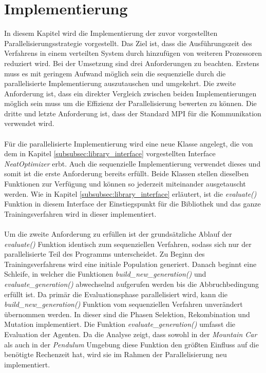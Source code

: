 \section{Implementierung}
\label{sec:parallel_implementation}
In diesem Kapitel wird die Implementierung der zuvor vorgestellten Parallelisierungsstrategie vorgestellt. Das Ziel ist, dass die Ausführungszeit des Verfahrens in einem verteilten System durch hinzufügen von weiteren Prozessoren reduziert wird. Bei der Umsetzung sind drei Anforderungen zu beachten. Erstens muss es mit geringem Aufwand möglich sein die sequenzielle durch die parallelisierte Implementierung auszutauschen und umgekehrt. Die zweite Anforderung ist, dass ein direkter Vergleich zwischen beiden Implementierungen möglich sein muss um die Effizienz der Parallelisierung bewerten zu können. Die dritte und letzte Anforderung ist, dass der Standard \ac{MPI} für die Kommunikation verwendet wird.
\\\\
Für die parallelisierte Implementierung wird eine neue Klasse angelegt, die von dem in Kapitel \ref{subsubsec:library_interface} vorgestellten Interface \emph{NeatOptimizer} erbt. Auch die sequenzielle Implementierung verwendet dieses und somit ist die erste Anforderung bereits erfüllt. Beide Klassen stellen dieselben Funktionen zur Verfügung und können so jederzeit miteinander ausgetauscht werden. Wie in Kapitel \ref{subsubsec:library_interface} erläutert, ist die \emph{evaluate()} Funktion in diesem Interface der Einstiegspunkt für die Bibliothek und das ganze Trainingsverfahren wird in dieser implementiert. 
\\\\
Um die zweite Anforderung zu erfüllen ist der grundsätzliche Ablauf der \emph{evaluate()} Funktion identisch zum sequenziellen Verfahren, sodass sich nur der parallelisierte Teil des Programms unterscheidet. Zu Beginn des Trainingsverfahrens wird eine initiale Population generiert. Danach beginnt eine Schleife, in welcher die Funktionen \emph{build\_new\_generation()} und \emph{evaluate\_generation()} abwechselnd aufgerufen werden bis die Abbruchbedingung erfüllt ist. Da primär die Evaluationsphase parallelisiert wird, kann die \emph{build\_new\_generation()} Funktion vom sequenziellen Verfahren unverändert übernommen werden. In dieser sind die Phasen Selektion, Rekombination und Mutation implementiert. Die Funktion \emph{evaluate\_generation()} umfasst die Evaluation der Agenten. Da die Analyse zeigt, dass sowohl in der \emph{Mountain Car} als auch in der \emph{Pendulum} Umgebung diese Funktion den größten Einfluss auf die benötigte Rechenzeit hat, wird sie im Rahmen der Parallelisierung neu implementiert.
